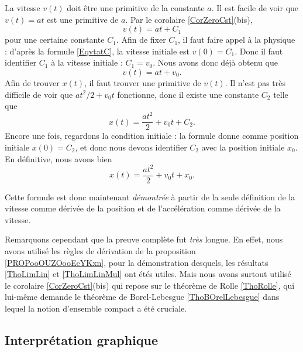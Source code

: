 La vitesse $v(t)$ doit être une primitive de la constante $a$. Il est facile de voir que $v(t)=at$ est une primitive de $a$. Par le corolaire \ref{CorZeroCst}(bis),
\begin{equation}    \label{EqvtatC}
	v(t)=at+C_1
\end{equation}
pour une certaine constante $C_1$. Afin de fixer $C_1$, il faut faire appel à la physique : d'après la formule \eqref{EqvtatC}, la vitesse initiale est $v(0)=C_1$. Donc il faut identifier $C_1$ à la vitesse initiale : $C_1=v_0$. Nous avons donc déjà obtenu que
\begin{equation}
	v(t)=at+v_0.
\end{equation}
Afin de trouver $x(t)$, il faut trouver une primitive de $v(t)$. Il n'est pas très difficile de voir que $at^2/2 + v_0t$ fonctionne, donc il existe une constante $C_2$ telle que
\begin{equation}
	x(t)=\frac{ at^2 }{ 2 }+v_0t+C_2.
\end{equation}
Encore une fois, regardons la condition initiale : la formule donne comme position initiale $x(0)=C_2$, et donc nous devons identifier $C_2$ avec la position initiale $x_0$. En définitive, nous avons bien
\begin{equation}
	x(t) = \frac{ at^2 }{ 2 } + v_0t +x_0.
\end{equation}

Cette formule est donc maintenant \emph{démontrée} à partir de la seule définition de la vitesse comme dérivée de la position et de l'accélération comme dérivée de la vitesse.

Remarquons cependant que la preuve complète fut \emph{très} longue. En effet, nous avons utilisé les règles de dérivation de la proposition \ref{PROPooOUZOooEcYKxn}, pour la démonstration desquels, les résultats \ref{ThoLimLin} et \ref{ThoLimLinMul} ont étés utiles. Mais nous avons surtout utilisé le corolaire \ref{CorZeroCst}(bis) qui repose sur le théorème de Rolle \ref{ThoRolle}, qui lui-même demande le théorème de Borel-Lebesgue \ref{ThoBOrelLebesgue} dans lequel la notion d'ensemble compact a été cruciale.

\subsection{Interprétation graphique}


